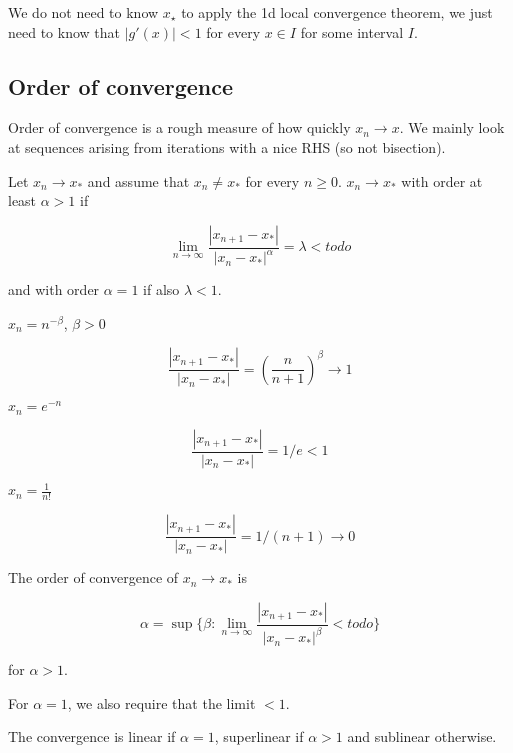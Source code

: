 \begin{remark}
	We do not need to know $x_{\star}$ to apply the 1d local convergence theorem, we just need to know that $|g'(x)| < 1$ for every $x \in I$ for some interval $I$.
\end{remark}

\subsection{Order of convergence}

Order of convergence is a rough measure of how quickly $x_n \rightarrow x$. We mainly look at sequences arising from iterations with a nice RHS (so not bisection).

\begin{definition}
	Let $x_n \rightarrow x_*$ and assume that $x_n \ne x_*$ for every $n \ge 0$. $x_n \rightarrow x_*$ with order at least $\alpha > 1$ if

	\[\lim_{n \rightarrow \infty} \frac{|x_{n + 1} - x_*|}{|x_n - x_*|^{\alpha}} = \lambda < todo\]

	and with order $\alpha = 1$ if also $\lambda < 1$.
\end{definition}

\begin{example}
	$x_n = n^{-\beta}$, $\beta > 0$

	\[\frac{|x_{n + 1} - x_*|}{|x_n - x_*|} = {(\frac{n}{n + 1})}^{\beta} \rightarrow 1\]
\end{example}

\begin{example}
	$x_n = e^{-n}$

	\[\frac{|x_{n + 1} - x_*|}{|x_n - x_*|} = 1/e < 1\]
\end{example}

\begin{example}
	$x_n = \frac{1}{n!}$

	\[\frac{|x_{n + 1} - x_*|}{|x_n - x_*|} = 1/(n + 1) \rightarrow 0\]
\end{example}

The order of convergence of $x_n \rightarrow x_*$ is

\[\alpha = \sup \{\beta: \lim_{n \rightarrow \infty} \frac{|x_{n + 1} - x_*|}{|x_n - x_*|^{\beta}} < todo\}\]

for $\alpha > 1$.

For $\alpha = 1$, we also require that the limit $< 1$.

The convergence is linear if $\alpha = 1$, superlinear if $\alpha > 1$ and sublinear otherwise.

